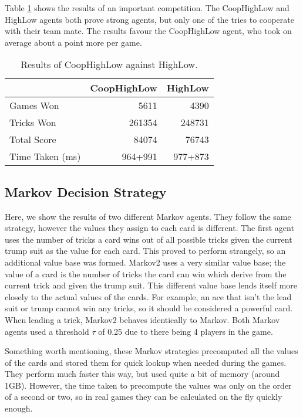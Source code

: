 Table \ref{tab:coophighlow_highlow} shows the results of an important competition. The CoopHighLow and HighLow agents both prove
strong agents, but only one of the tries to cooperate with their team mate. The results favour the CoopHighLow agent, who took
on average about a point more per game.

\begin{table}[ht]
    \centering
    \begin{tabular}{l|rr}
        ~               &   CoopHighLow &   HighLow  \\  \hline
        Games Won       &   5611        &   4390   \\
        Tricks Won      &   261354      &   248731 \\
        Total Score     &   84074       &   76743  \\
        Time Taken (ms) &   964+991   &   977+873
    \end{tabular}
    \caption{Results of CoopHighLow against HighLow.}
    \label{tab:coophighlow_highlow}
\end{table}



\subsection{Markov Decision Strategy}

Here, we show the results of two different Markov agents. They follow the same strategy, however the values they assign to each card
is different. The first agent uses the number of tricks a card wins out of all possible tricks given the current trump suit as the value for
each card. This proved to perform strangely, so an additional value base was formed. Markov2 uses a very similar value base; the value of
a card is the number of tricks the card can win which derive from the current trick and given the trump suit. This different value
base lends itself more closely to the actual values of the cards. For example, an ace that isn't the lead suit or trump cannot win any tricks,
so it should be considered a powerful card. When leading a trick, Markov2 behaves identically to Markov. Both Markov agents used a threshold $\tau$
of 0.25 due to there being 4 players in the game.

Something worth mentioning, these Markov strategies precomputed all the values of the cards and stored them for quick lookup when needed during
the games. They perform much faster this way, but used quite a bit of memory (around 1GB). However, the time taken to precompute the values
was only on the order of a second or two, so in real games they can be calculated on the fly quickly enough.

